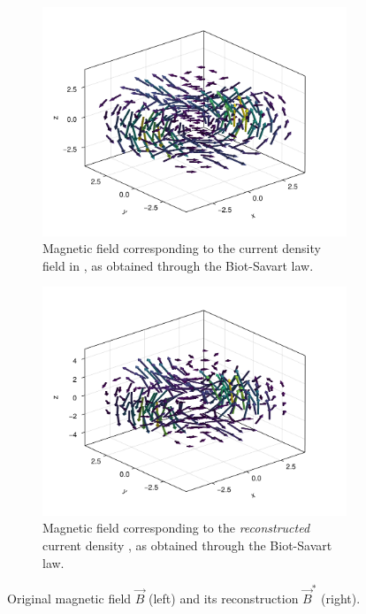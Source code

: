 \documentclass[10pt]{article}
\begin{document}
  \begin{figure}[H]
    \centering
    \begin{subfigure}[t]{0.48\textwidth}
      \centering
      \includegraphics[width=\textwidth]{../figures/cdpr-b-field.pdf}
      \caption{Magnetic field corresponding to the current density field in , as obtained through the Biot-Savart law.}
      \label{fig:cdpr-b-field}
    \end{subfigure}
    \hfill
    \begin{subfigure}[t]{0.48\textwidth}
      \centering
      \includegraphics[width=\textwidth]{../figures/cdprr-b-field.pdf}
      \caption{Magnetic field corresponding to the \textit{reconstructed} current density , as obtained through the Biot-Savart law.}
      \label{fig:cdprr-b-field}
    \end{subfigure}
    \caption{Original magnetic field $\vec{B}$ (left) and its reconstruction $\vec{B}^*$ (right).}
    \label{fig:b-field}
  \end{figure}
\end{document}
